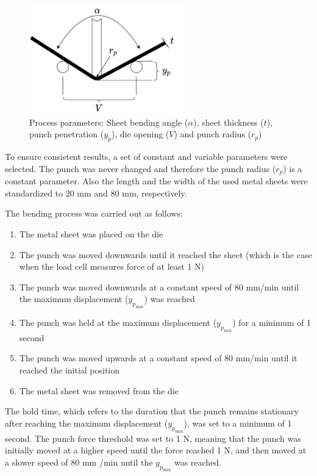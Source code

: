 \begin{figure}[h]
    \begin{tcolorbox}[arc=0pt,boxrule=0.5pt]
        \centering
        \includegraphics[trim=left botm right top, width=0.6\textwidth,
            clip]{chap4/images/process_parameters}
    \end{tcolorbox}
    \caption{Process parameters: Sheet bending angle ($\alpha$), sheet
    thickness ($t$), punch
    penetration ($y_p$), die opening ($V$) and punch radius ($r_p$)}
    \label{fig:process_parameters}
\end{figure}

To ensure consistent results, a set of constant and variable parameters were selected.
The punch was never changed and therefore the punch radius ($r_p$) is a constant parameter.
Also the length and the width of the used metal sheets were standardized to 20 mm and 80 mm, respectively.

The bending process was carried out as follows:
\begin{enumerate}
    \item The metal sheet was placed on the die
    \item The punch was moved downwards until it reached the sheet (which is the case when the load cell measures
    force of at least 1 N)
    \item The punch was moved downwards at a constant speed of 80 mm/min until the maximum displacement ($y_p_{\max}$)
    was reached
    \item The punch was held at the maximum displacement ($y_p_{\max}$) for a minimum of 1 second
    \item The punch was moved upwards at a constant speed of 80 mm/min until it reached the initial position
    \item The metal sheet was removed from the die
\end{enumerate}

The hold time, which refers to the duration that the punch remains stationary
after reaching the maximum displacement ($y_p_{\max}$), was set to a minimum of 1 second.
The punch force threshold was set to 1 N, meaning that the punch was initially moved at
a higher speed until the force reached 1 N, and then moved at a slower speed of 80 mm
/min until the $y_p_{\max}$ was reached.

